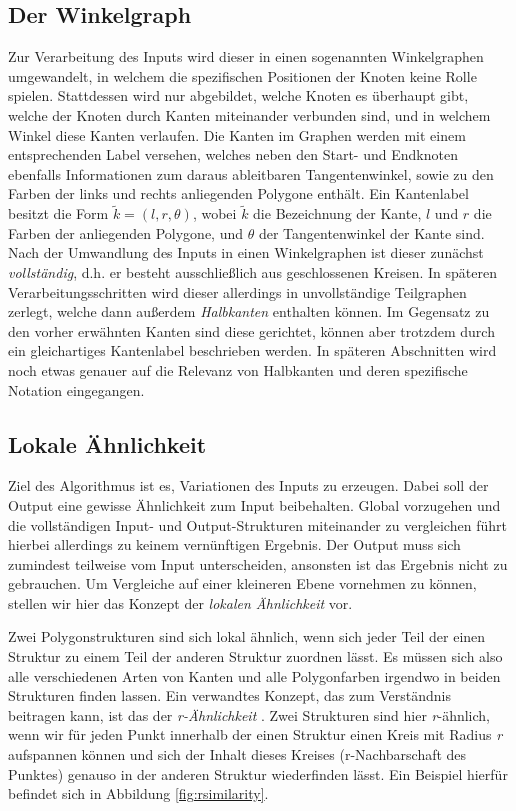\subsection{Der Winkelgraph}
Zur Verarbeitung des Inputs wird dieser in einen sogenannten Winkelgraphen umgewandelt, in welchem die spezifischen Positionen der Knoten
keine Rolle spielen. Stattdessen wird nur abgebildet, welche Knoten es überhaupt gibt, welche der Knoten durch Kanten miteinander verbunden
sind, und in welchem Winkel diese Kanten verlaufen.
Die Kanten im Graphen werden mit einem entsprechenden Label versehen, welches neben den Start- und Endknoten ebenfalls Informationen zum
daraus ableitbaren Tangentenwinkel, sowie zu den Farben der links und rechts anliegenden Polygone enthält. Ein Kantenlabel besitzt die Form
\(\tilde{k} = (l,r,\theta)\), wobei \(\tilde{k}\) die Bezeichnung der Kante, \(l\) und \(r\) die Farben der anliegenden Polygone, und
\(\theta\) der Tangentenwinkel der Kante sind.
Nach der Umwandlung des Inputs in einen Winkelgraphen ist dieser zunächst \textit{vollständig}, d.h. er besteht ausschließlich aus
geschlossenen Kreisen. In späteren Verarbeitungsschritten wird dieser allerdings in unvollständige Teilgraphen zerlegt, welche dann außerdem
\textit{Halbkanten} enthalten können. Im Gegensatz zu den vorher erwähnten Kanten sind diese gerichtet, können aber trotzdem durch ein
gleichartiges Kantenlabel beschrieben werden. In späteren Abschnitten wird noch etwas genauer auf die Relevanz von Halbkanten und deren
spezifische Notation eingegangen.

\subsection{Lokale Ähnlichkeit}
Ziel des Algorithmus ist es, Variationen des Inputs zu erzeugen. Dabei soll der Output eine gewisse Ähnlichkeit zum Input beibehalten. Global
vorzugehen und die vollständigen Input- und Output-Strukturen miteinander zu vergleichen führt hierbei allerdings zu keinem vernünftigen
Ergebnis. Der Output muss sich zumindest teilweise vom Input unterscheiden, ansonsten ist das Ergebnis nicht zu gebrauchen. Um Vergleiche
auf einer kleineren Ebene vornehmen zu können, stellen wir hier das Konzept der \textit{lokalen Ähnlichkeit} vor.

Zwei Polygonstrukturen sind sich lokal ähnlich, wenn sich jeder Teil der einen Struktur zu einem Teil der anderen Struktur zuordnen lässt. Es
müssen sich also alle verschiedenen Arten von Kanten und alle Polygonfarben irgendwo in beiden Strukturen finden lassen. Ein verwandtes Konzept,
das zum Verständnis beitragen kann, ist das der \textit{r-Ähnlichkeit} \cite{3_bokeloh_et_al}. Zwei Strukturen sind hier
\textit{r}-ähnlich, wenn wir für jeden Punkt innerhalb der einen Struktur einen Kreis mit Radius \textit{r} aufspannen können und sich der Inhalt
dieses Kreises (r-Nachbarschaft des Punktes) genauso in der anderen Struktur wiederfinden lässt. Ein Beispiel hierfür befindet sich in Abbildung
\ref{fig:rsimilarity}.

